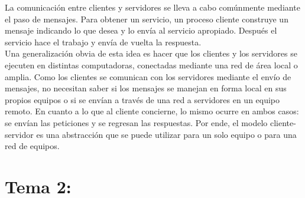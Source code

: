 \documentclass[10pt,a4paper,spanish]{report}
\begin{document}
  \noindent
  La comunicación entre clientes y servidores se lleva a cabo comúnmente mediante el paso de mensajes. Para obtener un servicio, un proceso cliente construye un mensaje indicando lo que desea y lo envía al servicio apropiado. Después el servicio hace el trabajo y envía de vuelta la respuesta. \\

  \noindent
  Una generalización obvia de esta idea es hacer que los clientes y los servidores se ejecuten en distintas computadoras, conectadas mediante una red de área local o amplia. Como los clientes se comunican con los servidores mediante el envío de mensajes, no necesitan saber si los mensajes se manejan en forma local en sus propios equipos o si se envían a través de una red a servidores en un equipo remoto. En cuanto a lo que al cliente concierne, lo mismo ocurre en ambos casos: se envían las peticiones y se regresan las respuestas. Por ende, el modelo cliente-servidor es una abstracción que se puede utilizar para un solo equipo o para una red de equipos.



  \chapter{Tema 2:}
\end{document}
